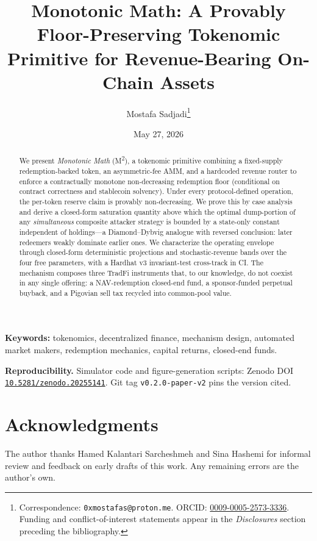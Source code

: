 \documentclass[11pt,a4paper]{article}
\title{Monotonic Math: A Provably Floor-Preserving Tokenomic Primitive for Revenue-Bearing On-Chain Assets}
\author{Mostafa Sadjadi\thanks{Correspondence: \texttt{0xmostafas@proton.me}. ORCID: \href{https://orcid.org/0009-0005-2573-3336}{0009-0005-2573-3336}. Funding and conflict-of-interest statements appear in the \emph{Disclosures} section preceding the bibliography.}}
\affil{Independent Researcher}
\date{May 27, 2026}
\theoremstyle{plain}
\theoremstyle{definition}
\theoremstyle{remark}
\begin{document}
\maketitle

\begin{abstract}
We present \emph{Monotonic Math} (M\textsuperscript{2}), a tokenomic primitive combining a fixed-supply redemption-backed token, an asymmetric-fee AMM, and a hardcoded revenue router to enforce a contractually monotone non-decreasing redemption floor (conditional on contract correctness and stablecoin solvency). Under every protocol-defined operation, the per-token reserve claim is provably non-decreasing. We prove this by case analysis and derive a closed-form saturation quantity above which the optimal dump-portion of any \emph{simultaneous} composite attacker strategy is bounded by a state-only constant independent of holdings---a Diamond--Dybvig analogue with reversed conclusion: later redeemers weakly dominate earlier ones. We characterize the operating envelope through closed-form deterministic projections and stochastic-revenue bands over the four free parameters, with a Hardhat v3 invariant-test cross-track in CI. The mechanism composes three TradFi instruments that, to our knowledge, do not coexist in any single offering: a NAV-redemption closed-end fund, a sponsor-funded perpetual buyback, and a Pigovian sell tax recycled into common-pool value.
\end{abstract}

\noindent\textbf{Keywords:} tokenomics, decentralized finance, mechanism design, automated market makers, redemption mechanics, capital returns, closed-end funds.

\medskip\noindent\textbf{Reproducibility.} Simulator code and figure-generation scripts: Zenodo DOI \href{https://doi.org/10.5281/zenodo.20255141}{\texttt{10.5281/zenodo.20255141}}. Git tag \texttt{v0.2.0-paper-v2} pins the version cited.










\section*{Acknowledgments}
The author thanks Hamed Kalantari Sarcheshmeh and Sina Hashemi for informal review and feedback on early drafts of this work. Any remaining errors are the author's own.
\end{document}
